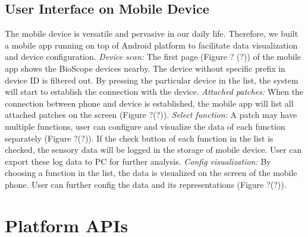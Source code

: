 \subsection{User Interface on Mobile Device}
The mobile device is versatile and pervasive in our daily life.
Therefore, we built a mobile app running on top of Android platform to facilitate data visualization and device configuration.
\vspace{10pt}
\newline
\textit{Device scan:}
\newline
The first page (Figure ? (?)) of the mobile app shows the BioScope devices nearby. The device without specific prefix in device ID is filtered out. By pressing the particular device in the list, the system will start to establish the connection with the device.
\vspace{10pt}
\newline
\textit{Attached patches:}
\newline
When the connection between phone and device is established, the mobile app will list all attached patches on the screen (Figure ?(?)).
\vspace{10pt}
\newline
\textit{Select function:}
\newline
A patch may have multiple functions, user can configure and visualize the data of each function separately (Figure ?(?)).
If the check button of each function in the list is checked, the sensory data will be logged in the storage of mobile device.
User can export these log data to PC for further analysis.
\vspace{10pt}
\newline
\textit{Config visualization:}
\newline
By choosing a function in the list, the data is visualized on the screen of the mobile phone. User can further config the data and its representations (Figure ?(?)).



\section{Platform APIs}



\let\cleardoublepage\clearpage